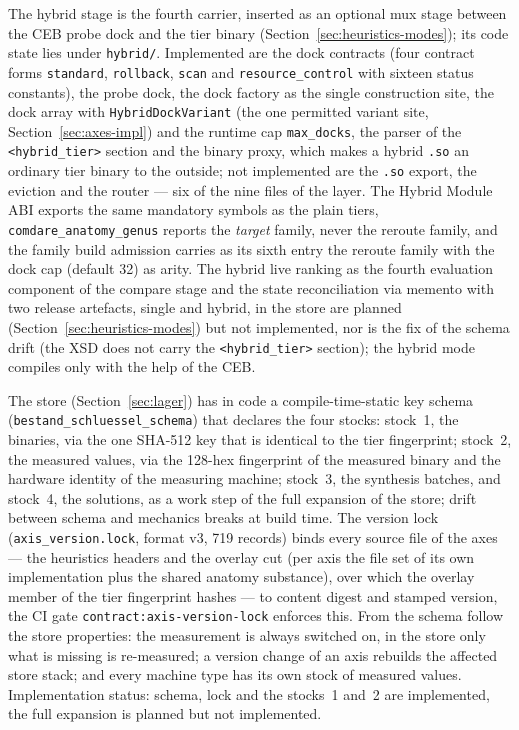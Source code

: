 \begin{nurkurz}
The hybrid stage is the fourth carrier, inserted as an optional mux stage between the CEB probe dock and
the tier binary (Section~\ref{sec:heuristics-modes}); its code state lies
under \texttt{hybrid/}. Implemented are the dock contracts (four contract forms \texttt{standard},
\texttt{rollback}, \texttt{scan} and \texttt{resource\_control} with sixteen status constants), the
probe dock, the dock factory as the single construction site, the dock array with
\texttt{HybridDockVariant} (the one permitted variant site, Section~\ref{sec:axes-impl}) and the
runtime cap \texttt{max\_docks}, the parser of the \texttt{<hybrid\_tier>} section and the binary
proxy, which makes a hybrid \texttt{.so} an ordinary tier binary to the outside; not implemented are the
\texttt{.so} export, the eviction and the router --- six of the nine files of the layer. The Hybrid
Module ABI exports the same mandatory symbols as the plain tiers, \texttt{comdare\_anatomy\_genus}
reports the \emph{target} family, never the reroute family, and the family build admission carries as its
sixth entry the reroute family with the dock cap (default 32) as arity. The hybrid live ranking as the
fourth evaluation component of the compare stage and the state reconciliation via memento with two
release artefacts, single and hybrid, in the store are planned (Section~\ref{sec:heuristics-modes})
but not implemented, nor is the fix of the schema drift (the XSD does not carry the
\texttt{<hybrid\_tier>} section); the hybrid mode compiles only with the help of the CEB\@.

The store (Section~\ref{sec:lager}) has in code a compile-time-static key schema
(\texttt{bestand\_\allowbreak{}schluessel\_\allowbreak{}schema}) that declares the four stocks:
stock~1, the binaries, via the one SHA-512 key that is identical to the tier fingerprint; stock~2, the
measured values, via the 128-hex fingerprint of the measured binary and the hardware identity of the
measuring machine; stock~3, the synthesis batches, and stock~4, the solutions, as a work step of the
full expansion of the store; drift between schema and mechanics breaks at build time. The version lock
(\texttt{axis\_version.lock}, format v3, 719 records) binds every source file of the axes --- the
heuristics headers and the overlay cut (per axis the file set of its own implementation plus the shared
anatomy substance), over which the overlay member of the tier fingerprint hashes --- to content digest
and stamped version, the CI gate \texttt{contract:axis-version-lock} enforces this. From the schema
follow the store properties: the measurement is always switched on, in the store only what is missing
is re-measured; a version change of an axis rebuilds the affected store stack; and every machine type
has its own stock of measured values. Implementation status: schema, lock and the stocks~1 and~2 are
implemented, the full expansion is planned but not implemented.
\end{nurkurz}


